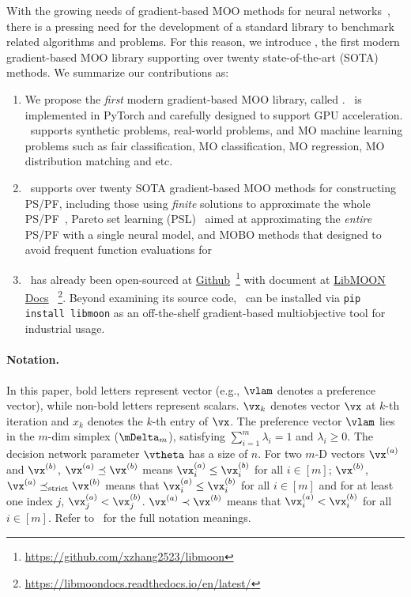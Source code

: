 With the growing needs of gradient-based MOO methods for neural networks~\cite{sener2018multi, lin2019pareto,xu2020prediction,peitz2018gradient}, there is a pressing need for the development of a standard library to benchmark related algorithms and problems. For this reason, we introduce \algoname, the first modern gradient-based MOO library supporting over twenty state-of-the-art (SOTA) methods. We summarize our contributions as:
\begin{enumerate}[itemsep=-0.2em, topsep=0.0em, leftmargin=1.0em]
    \item We propose the \textit{first} modern gradient-based MOO library, called \algoname. \algoname~is implemented in PyTorch\cite{imambi2021pytorch} and carefully designed to support GPU acceleration. \algoname~supports synthetic problems, real-world problems, and MO machine learning problems such as fair classification, MO classification, MO regression, MO distribution matching and etc. 
    \item \algoname~supports over twenty SOTA gradient-based MOO methods for constructing PS/PF, including those using \emph{finite} solutions to approximate the whole PS/PF~\cite{mahapatra2020multi,liu2021profiling}, Pareto set learning (PSL)~\cite{navon2020learning,lin2020controllable} aimed at approximating the \emph{entire} PS/PF with a single neural model, and MOBO methods that designed to avoid frequent function evaluations for  
    \item \algoname~has already been open-sourced at \href{https://github.com/xzhang2523/libmoon}{Github}~\footnote{\url{https://github.com/xzhang2523/libmoon}} with document at \href{https://libmoondocs.readthedocs.io/en/latest/}{LibMOON Docs} ~\footnote{\url{https://libmoondocs.readthedocs.io/en/latest/}}. Beyond examining its source code, \algoname~can be installed via \texttt{pip install libmoon} as an off-the-shelf gradient-based multiobjective tool for industrial usage. 
\end{enumerate}

\paragraph{Notation.} In this paper, bold letters represent vector (e.g., $\vlam$ denotes a preference vector), while non-bold letters represent scalars. $\vx_k$ denotes vector $\vx$ at $k$-th iteration and $x_k$ denotes the $k$-th entry of $\vx$. The preference vector $\vlam$ lies in the $m$-dim simplex ($\mDelta_m$), satisfying $\sum_{i=1}^m \lambda_i=1$ and $\lambda_i \geq 0$. The decision network parameter $\vtheta$ has a size of $n$.
For two $m$-D vectors $\vx^{(a)}$ and $\vx^{(b)}$, $\vx^{(a)} \preceq \vx^{(b)}$ means $\vx_i^{(a)} \leq \vx_i^{(b)}$ for all $i \in [m]$; $\vx^{(b)}$, $\vx^{(a)} \preceq_\mathrm{strict} \vx^{(b)}$ means that $\vx_i^{(a)} \leq \vx_i^{(b)}$ for all $i \in [m]$ and for at least one index $j$, $\vx_j^{(a)} < \vx_j^{(b)}$. $\vx^{(a)} \prec \vx^{(b)}$ means that $\vx_i^{(a)} < \vx_i^{(b)}$ for all $i \in [m]$. 
Refer to~ for the full notation meanings.

